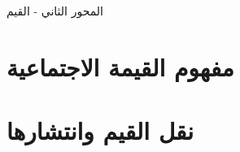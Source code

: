 \documentclass[a4paper,12pt]{article}
\begin{document}
\begin{center}
    \huge{المحور الثاني - القيم}
\end{center}

\medskip
\tableofcontents
\thispagestyle{empty}
\newpage

\setcounter{page}{1}

\section{مفهوم القيمة الاجتماعية}


\section{نقل القيم وانتشارها}

\end{document}
